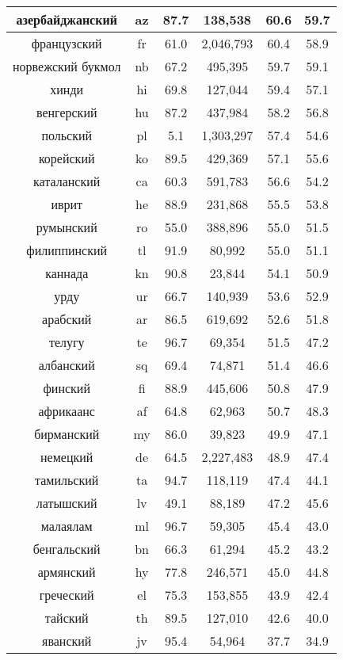 \begin{table*}
{\begin{tabular}{|c|c|c||c|c|c|}
азербайджанский & az & 87.7 & 138,538 & 60.6 & 59.7\\ \hline
французский & fr & 61.0 & 2,046,793 & 60.4 & 58.9\\ \hline
норвежский букмол & nb & 67.2 & 495,395 & 59.7 & 59.1\\ \hline
хинди & hi & 69.8 & 127,044 & 59.4 & 57.1\\ \hline
венгерский & hu & 87.2 & 437,984 & 58.2 & 56.8\\ \hline
польский & pl & 5.1 & 1,303,297 & 57.4 & 54.6\\ \hline
корейский & ko & 89.5 & 429,369 & 57.1 & 55.6\\ \hline
каталанский & ca & 60.3 & 591,783 & 56.6 & 54.2\\ \hline
иврит & he & 88.9 & 231,868 & 55.5 & 53.8\\ \hline
румынский & ro & 55.0 & 388,896 & 55.0 & 51.5\\ \hline
филиппинский & tl & 91.9 & 80,992 & 55.0 & 51.1\\ \hline
каннада & kn & 90.8 & 23,844 & 54.1 & 50.9\\ \hline
урду & ur & 66.7 & 140,939 & 53.6 & 52.9\\ \hline
арабский & ar & 86.5 & 619,692 & 52.6 & 51.8\\ \hline
телугу & te & 96.7 & 69,354 & 51.5 & 47.2\\ \hline
албанский & sq & 69.4 & 74,871 & 51.4 & 46.6\\ \hline
финский & fi & 88.9 & 445,606 & 50.8 & 47.9\\ \hline
африкаанс & af & 64.8 & 62,963 & 50.7 & 48.3\\ \hline
бирманский & my & 86.0 & 39,823 & 49.9 & 47.1\\ \hline
немецкий & de & 64.5 & 2,227,483 & 48.9 & 47.4\\ \hline
тамильский & ta & 94.7 & 118,119 & 47.4 & 44.1\\ \hline
латышский & lv & 49.1 & 88,189 & 47.2 & 45.6\\ \hline
малаялам & ml & 96.7 & 59,305 & 45.4 & 43.0\\ \hline
бенгальский & bn & 66.3 & 61,294 & 45.2 & 43.2\\ \hline
армянский & hy & 77.8 & 246,571 & 45.0 & 44.8\\ \hline
греческий & el & 75.3 & 153,855 & 43.9 & 42.4\\ \hline
тайский & th & 89.5 & 127,010 & 42.6 & 40.0\\ \hline
яванский & jv & 95.4 & 54,964 & 37.7 & 34.9\\ \hline

\end{tabular}}
\end{table*}
